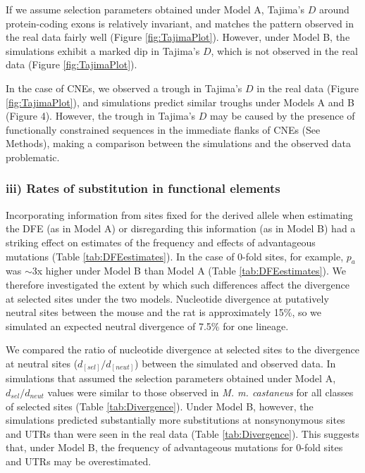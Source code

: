 	If we assume selection parameters obtained under Model A, Tajima's $D$ around protein-coding exons is relatively invariant, and matches the pattern observed in the real data fairly well (Figure \ref{fig:TajimaPlot}). However, under Model B, the simulations exhibit a marked dip in Tajima's $D$, which is not observed in the real data (Figure \ref{fig:TajimaPlot}).

	In the case of CNEs, we observed a trough in Tajima's $D$ in the real data (Figure \ref{fig:TajimaPlot}), and simulations predict similar troughs under Models A and B (Figure 4). However, the trough in Tajima's $D$ may be caused by the presence of functionally constrained sequences in the immediate flanks of CNEs (See Methods), making a comparison between the simulations and the observed data problematic.

\subsubsection{iii) Rates of substitution in functional elements}

Incorporating information from sites fixed for the derived allele when estimating the DFE (as in Model A) or disregarding this information (as in Model B) had a striking effect on estimates of the frequency and effects of advantageous mutations (Table \ref{tab:DFEestimates}). In the case of 0-fold sites, for example, $p_a$ was $\sim$3x higher under Model B than Model A (Table \ref{tab:DFEestimates}). We therefore investigated the extent by which such differences affect the divergence at selected sites under the two models. Nucleotide divergence at putatively neutral sites between the mouse and the rat is approximately 15\%, so we simulated an expected neutral divergence of 7.5\% for one lineage. 

We compared the ratio of nucleotide divergence at selected sites to the divergence at neutral sites ($d_[sel]/d_[neut]$) between the simulated and observed data. In simulations that assumed the selection parameters obtained under Model A, $d_{sel}/d_{neut}$ values were similar to those observed in \textit{M. m. castaneus} for all classes of selected sites (Table \ref{tab:Divergence}). Under Model B, however, the simulations predicted substantially more substitutions at nonsynonymous sites and UTRs than were seen in the real data (Table \ref{tab:Divergence}). This suggests that, under Model B, the frequency of advantageous mutations for 0-fold sites and UTRs may be overestimated.

